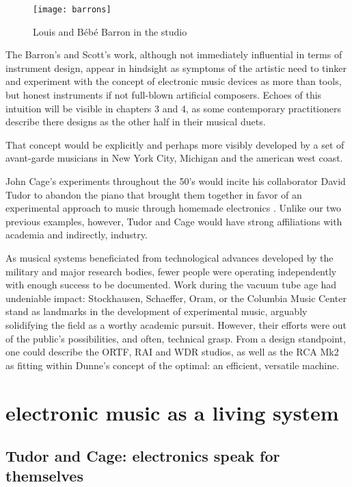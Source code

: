 \begin{itemize}
	\begin{figure}[h!]
	  \caption{Louis and Bébé Barron in the studio}
	  \centering
	    \texttt{[image: barrons]}
	\end{figure} 
	
The Barron's and Scott's work, although not immediately influential in terms of instrument design, appear in hindsight as symptoms of the artistic need to tinker and experiment with the concept of electronic music devices as more than tools, but honest instruments if not full-blown artificial composers. Echoes of this intuition will be visible in chapters 3 and 4, as some contemporary practitioners describe there designs as the other half in their musical duets. 

That concept would be explicitly and perhaps more visibly developed by a set of avant-garde musicians in New York City, Michigan and the american west coast. 

John Cage’s experiments throughout the 50’s would incite his collaborator David Tudor to abandon the piano that brought them together in favor of an experimental approach to music through homemade electronics \citep{holzaepfel1994,collins2004}. Unlike our two previous examples, however, Tudor and Cage would have strong affiliations with academia and indirectly, industry. 

As musical systems beneficiated from technological advances developed by the military and major research bodies, fewer people were operating independently with enough success to be documented. Work during the vacuum tube age had undeniable impact: Stockhausen, Schaeffer, Oram, or the Columbia Music Center stand as landmarks in the development of experimental music, arguably solidifying the field as a worthy academic pursuit. However, their efforts were out of the public's possibilities, and often, technical grasp. From a design standpoint, one could describe the ORTF, RAI and WDR studios, as well as the RCA Mk2 as fitting within Dunne's concept of the optimal: an efficient, versatile machine. 

\section{electronic music as a living system}

\subsection{Tudor and Cage: electronics speak for themselves}


\end{itemize}
